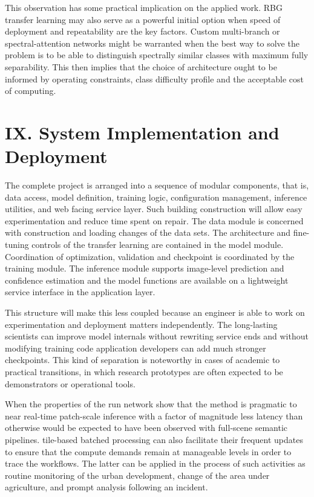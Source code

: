 ﻿\documentclass[conference]{IEEEtran}
\begin{document}
This observation has some practical implication on the applied work. RBG transfer learning may also serve as a powerful initial option when speed of deployment and repeatability are the key factors. Custom multi-branch or spectral-attention networks might be warranted when the best way to solve the problem is to be able to distinguish spectrally similar classes with maximum fully separability. This then implies that the choice of architecture ought to be informed by operating constraints, class difficulty profile and the acceptable cost of computing.

\section*{IX. System Implementation and Deployment}

The complete project is arranged into a sequence of modular components, that is, data access, model definition, training logic, configuration management, inference utilities, and web facing service layer. Such building construction will allow easy experimentation and reduce time spent on repair. The data module is concerned with construction and loading changes of the data sets. The architecture and fine-tuning controls of the transfer learning are contained in the model module. Coordination of optimization, validation and checkpoint is coordinated by the training module. The inference module supports image-level prediction and confidence estimation and the model functions are available on a lightweight service interface in the application layer.

This structure will make this less coupled because an engineer is able to work on experimentation and deployment matters independently. The long-lasting scientists can improve model internals without rewriting service ends and without modifying training code application developers can add much stronger checkpoints. This kind of separation is noteworthy in cases of academic to practical transitions, in which research prototypes are often expected to be demonstrators or operational tools.

When the properties of the run network show that the method is pragmatic to near real-time patch-scale inference with a factor of magnitude less latency than otherwise would be expected to have been observed with full-scene semantic pipelines. tile-based batched processing can also facilitate their frequent updates to ensure that the compute demands remain at manageable levels in order to trace the workflows. The latter can be applied in the process of such activities as routine monitoring of the urban development, change of the area under agriculture, and prompt analysis following an incident.
\end{document}
